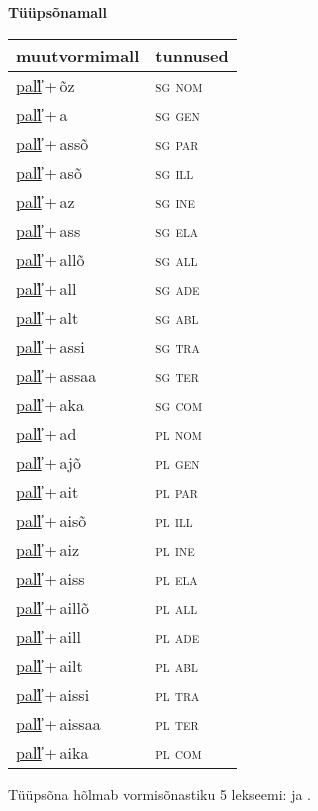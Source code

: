 
\vspace{1.8em}
\begin{minipage}{\textwidth}
\textbf{Tüüpsõnamall \,}\\

\begin{sideways}
\begin{tabular}{l l}
muutvormimall & tunnused \\
\hline
\underline{pal̕l̕}\,+\,õz & \textsc{ sg nom } \\
\underline{pal̕l̕}\,+\,a & \textsc{ sg gen } \\
\underline{pal̕l̕}\,+\,assõ & \textsc{ sg par } \\
\underline{pal̕l̕}\,+\,asõ & \textsc{ sg ill } \\
\underline{pal̕l̕}\,+\,az & \textsc{ sg ine } \\
\underline{pal̕l̕}\,+\,ass & \textsc{ sg ela } \\
\underline{pal̕l̕}\,+\,allõ & \textsc{ sg all } \\
\underline{pal̕l̕}\,+\,all & \textsc{ sg ade } \\
\underline{pal̕l̕}\,+\,alt & \textsc{ sg abl } \\
\underline{pal̕l̕}\,+\,assi & \textsc{ sg tra } \\
\underline{pal̕l̕}\,+\,assaa & \textsc{ sg ter } \\
\underline{pal̕l̕}\,+\,aka & \textsc{ sg com } \\
\underline{pal̕l̕}\,+\,ad & \textsc{ pl nom } \\
\underline{pal̕l̕}\,+\,ajõ & \textsc{ pl gen } \\
\underline{pal̕l̕}\,+\,ait & \textsc{ pl par } \\
\underline{pal̕l̕}\,+\,aisõ & \textsc{ pl ill } \\
\underline{pal̕l̕}\,+\,aiz & \textsc{ pl ine } \\
\underline{pal̕l̕}\,+\,aiss & \textsc{ pl ela } \\
\underline{pal̕l̕}\,+\,aillõ & \textsc{ pl all } \\
\underline{pal̕l̕}\,+\,aill & \textsc{ pl ade } \\
\underline{pal̕l̕}\,+\,ailt & \textsc{ pl abl } \\
\underline{pal̕l̕}\,+\,aissi & \textsc{ pl tra } \\
\underline{pal̕l̕}\,+\,aissaa & \textsc{ pl ter } \\
\underline{pal̕l̕}\,+\,aika & \textsc{ pl com } \\
\end{tabular}
\end{sideways}
\label{tab:tüüpsõnamall-pal̕l̕õz}

\end{minipage}

 
\vspace{1em}
\noindent Tüüpsõna hõlmab vormisõnastiku 5 lekseemi:  ja .
